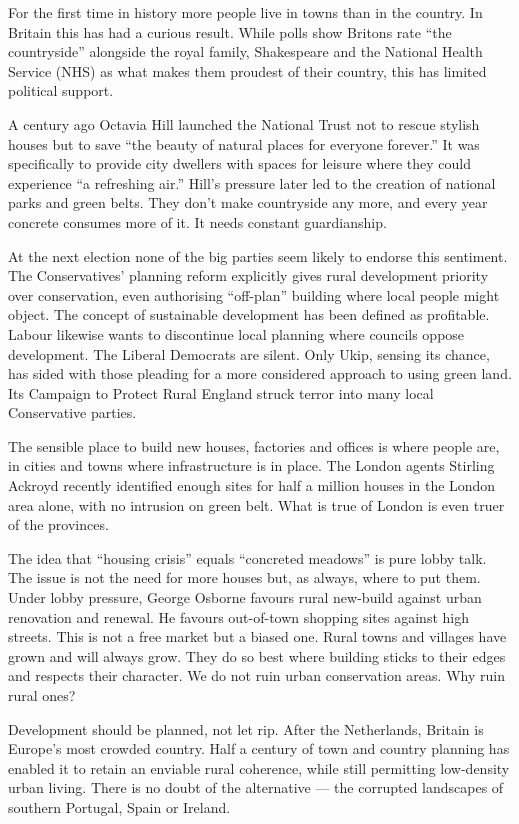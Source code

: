\documentclass[UTF8,11pt]{ctexart}
\begin{document}
For the first time in history more people live in towns than in the country. In Britain this has had a curious result. While polls show Britons rate “the countryside” alongside the royal family, Shakespeare and the National Health Service (NHS) as what makes them proudest of their country, this has limited political support.


A century ago Octavia Hill launched the National Trust not to rescue stylish houses but to save “the beauty of natural places for everyone forever.” It was specifically to provide city dwellers with spaces for leisure where they could experience “a refreshing air.” Hill’s pressure later led to the creation of national parks and green belts. They don’t make countryside any more, and every year concrete consumes more of it. It needs constant guardianship.


At the next election none of the big parties seem likely to endorse this sentiment. The Conservatives’ planning reform explicitly gives rural development priority over conservation, even authorising “off-plan” building where local people might object. The concept of sustainable development has been defined as profitable. Labour likewise wants to discontinue local planning where councils oppose development. The Liberal Democrats are silent. Only Ukip, sensing its chance, has sided with those pleading for a more considered approach to using green land. Its Campaign to Protect Rural England struck terror into many local Conservative parties.


The sensible place to build new houses, factories and offices is where people are, in cities and towns where infrastructure is in place. The London agents Stirling Ackroyd recently identified enough sites for half a million houses in the London area alone, with no intrusion on green belt. What is true of London is even truer of the provinces.


The idea that “housing crisis” equals “concreted meadows” is pure lobby talk. The issue is not the need for more houses but, as always, where to put them. Under lobby pressure, George Osborne favours rural new-build against urban renovation and renewal. He favours out-of-town shopping sites against high streets. This is not a free market but a biased one. Rural towns and villages have grown and will always grow. They do so best where building sticks to their edges and respects their character. We do not ruin urban conservation areas. Why ruin rural ones?


Development should be planned, not let rip. After the Netherlands, Britain is Europe’s most crowded country. Half a century of town and country planning has enabled it to retain an enviable rural coherence, while still permitting low-density urban living. There is no doubt of the alternative — the corrupted landscapes of southern Portugal, Spain or Ireland.
\end{document}
